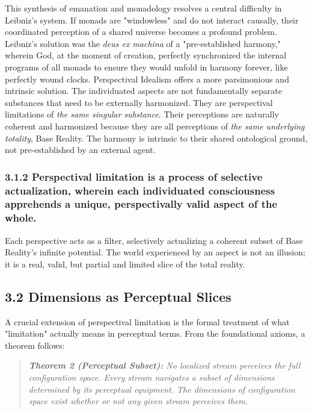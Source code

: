 This synthesis of emanation and monadology resolves a central difficulty in Leibniz's system. If monads are "windowless" and do not interact causally, their coordinated perception of a shared universe becomes a profound problem. Leibniz's solution was the \textit{deus ex machina} of a "pre-established harmony," wherein God, at the moment of creation, perfectly synchronized the internal programs of all monads to ensure they would unfold in harmony forever, like perfectly wound clocks. Perspectival Idealism offers a more parsimonious and intrinsic solution. The individuated aspects are not fundamentally separate substances that need to be externally harmonized. They are perspectival limitations of \textit{the same singular substance}. Their perceptions are naturally coherent and harmonized because they are all perceptions of \textit{the same underlying totality}, Base Reality. The harmony is intrinsic to their shared ontological ground, not pre-established by an external agent.


\subsubsection*{3.1.2 Perspectival limitation is a process of selective actualization, wherein each individuated consciousness apprehends a unique, perspectivally valid aspect of the whole.}


Each perspective acts as a filter, selectively actualizing a coherent subset of Base Reality's infinite potential. The world experienced by an aspect is not an illusion; it is a real, valid, but partial and limited slice of the total reality.


\subsection*{3.2 Dimensions as Perceptual Slices}


A crucial extension of perspectival limitation is the formal treatment of what "limitation" actually means in perceptual terms. From the foundational axioms, a theorem follows:


\begin{quote}
\itshape
\textbf{Theorem 2 (Perceptual Subset):} \textit{No localized stream perceives the full configuration space. Every stream navigates a subset of dimensions determined by its perceptual equipment. The dimensions of configuration space exist whether or not any given stream perceives them.}
\end{quote}


